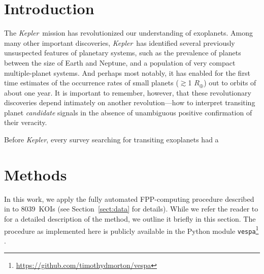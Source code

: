\documentclass{emulateapj}
\newcommand{\sectionname}{Section}
\newcommand{\Sect}[1]{\sectionname~\ref{sect:#1}}
\newcommand{\sect}[1]{\Sect{#1}}
\newcommand{\sectlabel}[1]{\label{sect:#1}}
\newcommand{\ncalc}{8039}
\newcommand{\kepler}{\textit{Kepler}}
\newcommand{\vespa}{\texttt{vespa}}
\begin{document}

\keywords{}


\section{Introduction}

The \kepler\ mission has revolutionized our understanding of
exoplanets.  Among many other important discoveries, \kepler\ has
identified several previously unsuspected features of planetary
systems, such as the prevalence of planets between the size of Earth
and Neptune, and a population of very compact multiple-planet
systems. And perhaps most notably, it has enabled for the first time
estimates of the occurrence rates of small planets ($\gtrsim$1
$R_\oplus$) out to orbits of about one year.  It is important to
remember, however, that these revolutionary discoveries depend
intimately on another revolution---how to interpret transiting planet
\textit{candidate} signals in the absence of unambiguous positive
confirmation of their veracity.

Before \kepler, every survey searching for transiting exoplanets had a 




\section{Methods}
\sectlabel{methods}

In this work, we apply the fully automated FPP-computing procedure
described in \citet[][hereafter ]{Morton:2012}
to \ncalc\ KOIs (see \sect{data} for details).  While we refer the
reader to  for a detailed description of the
method, we outline it briefly in this section.  The procedure as
implemented here is publicly available in the Python module
\vespa\footnote{\url{https://github.com/timothydmorton/vespa}}
\citep{vespa}.
\end{document}
